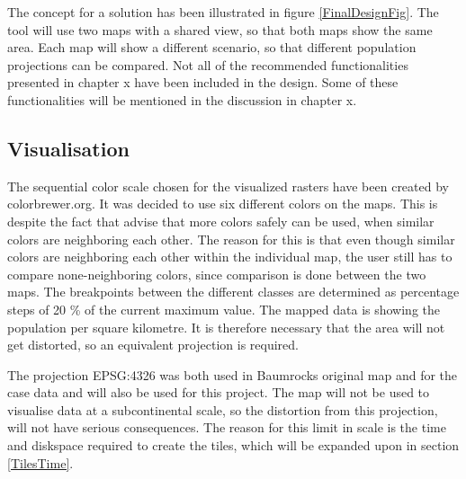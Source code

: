 The concept for a solution has been illustrated in figure \ref{FinalDesignFig}. The tool will use two maps with a shared view, so that both maps show the same area. Each map will show a different scenario, so that different population projections can be compared. Not all of the recommended functionalities presented in chapter x have been included in the design. Some of these functionalities will be mentioned in the discussion in chapter x.


\subsection{Visualisation}
The sequential color scale chosen for the visualized rasters have been created by colorbrewer.org. It was decided to use six different colors on the maps. This is despite the fact that \citet{ColorBrewerwebsite} advise that more colors safely can be used, when similar colors are neighboring each other. The reason for this is that even though similar colors are neighboring each other within the individual map, the user still has to compare none-neighboring colors, since comparison is done between the two maps. 
The breakpoints between the different classes are determined as percentage steps of 20 \% of the current maximum value.  
The mapped data is showing the population per square kilometre. It is therefore necessary that the area will not get distorted, so an equivalent projection is required. 

The projection EPSG:4326 was both used in Baumrocks original map and for the case data and will also be used for this project. The map will not be used to visualise data at a subcontinental scale, so the distortion from this projection, will not have serious consequences. The reason for this limit in scale is the time and diskspace required to create the tiles, which will be expanded upon in section \ref{TilesTime}.
